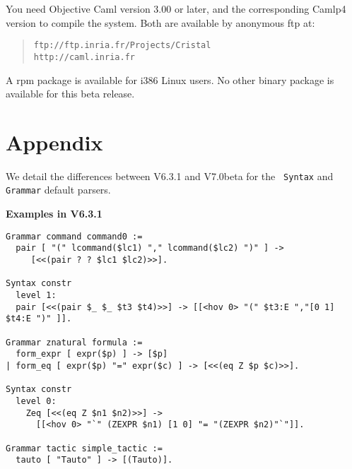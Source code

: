 \documentclass[11pt]{article}
\begin{document}
You need Objective Caml version 3.00 or later, and the corresponding 
Camlp4 version to compile the system. Both are available by anonymous ftp
at:

\begin{quote}
\verb|ftp://ftp.inria.fr/Projects/Cristal|\\
\verb|http://caml.inria.fr|
\end{quote}

\noindent
%

A rpm package is available for i386 Linux users. No other binary
package is available for this beta release.

%

%
%

\section*{Appendix}
\label{Appendix}
We detail the differences between {\Coq} V6.3.1 and V7.0beta for the {\tt
Syntax} and {\tt Grammar} default parsers.

\medskip

{\bf Examples in V6.3.1}

\begin{verbatim}
Grammar command command0 :=
  pair [ "(" lcommand($lc1) "," lcommand($lc2) ")" ] ->
	 [<<(pair ? ? $lc1 $lc2)>>].

Syntax constr
  level 1:
  pair [<<(pair $_ $_ $t3 $t4)>>] -> [[<hov 0> "(" $t3:E ","[0 1] $t4:E ")" ]].

Grammar znatural formula :=
  form_expr [ expr($p) ] -> [$p]
| form_eq [ expr($p) "=" expr($c) ] -> [<<(eq Z $p $c)>>].

Syntax constr
  level 0:
    Zeq [<<(eq Z $n1 $n2)>>] -> 
      [[<hov 0> "`" (ZEXPR $n1) [1 0] "= "(ZEXPR $n2)"`"]].

Grammar tactic simple_tactic :=
  tauto [ "Tauto" ] -> [(Tauto)].
\end{verbatim}
\end{document}
